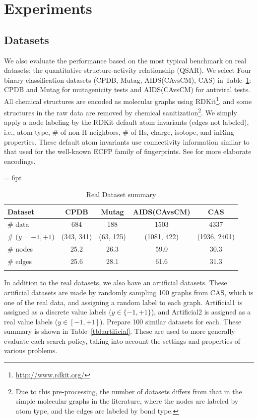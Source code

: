 \section{Experiments}
\subsection{Datasets}
We also evaluate the performance based on the most typical benchmark on real datasets:
the quantitative structure-activity relationship (QSAR). 
We select Four binary-classification datasets (CPDB, Mutag, AIDS(CAvsCM), CAS) in Table~\ref{tbl:dataset}: 
CPDB and Mutag for mutagenicity tests and AIDS(CAvsCM) for antiviral tests.
All chemical structures are encoded as molecular graphs using RDKit\footnote{\url{http://www.rdkit.org/}}, 
and some structures in the raw data are removed by chemical sanitization\footnote{
Due to this pre-processing, the number of datasets differs from that 
in the simple molecular graphs in the literature, 
where the nodes are labeled by atom type, and the edges are labeled by bond type.}.
We simply apply a node labeling by the RDKit default atom invariants (edges not labeled), i.e., 
atom type, \# of non-H neighbors, \# of Hs, charge, isotope, and inRing properties. 
These default atom invariants use connectivity information similar to that used for the well-known 
ECFP family of fingerprints\cite{Rogers:2010}. See \cite{Kearnes2016} for more elaborate encodings.

\tabcolsep = 6pt
\begin{table}[h]
  \centering
  \caption{Real Dataset summary}
  \label{tbl:dataset}
  	\begin{tabular}{lcccc}
		\thickhline
		Dataset			& CPDB           & Mutag        & AIDS(CAvsCM)     & CAS	\\  \hline
		\# data			& 684            & 188          & 1503             & 4337	\\
		\# ($y=-1,+1$)	& (343, 341)     & (63, 125)    & (1081, 422)      & (1936, 2401)	\\  
		\# nodes		& 25.2           & 26.3         & 59.0             & 30.3	\\  
		\# edges		& 25.6           & 28.1         & 61.6             & 31.3	\\  
		\thickhline
		\end{tabular}
\end{table}

In addition to the real datasets, we also have an artificial datasets.
These artificial datasets are made by randomly sampling 100 graphs from CAS, 
which is one of the real data, and assigning a random label to each graph. 
Artificial1 is assigned as a discrete value labels ($y \in \{-1, +1\}$), 
and Artificial2 is assigned as a real value labels ($y \in [-1, +1]$).
Prepare 100 similar datasets for each.
These summary is shown in Table~\ref{tbl:artificial}.
These are used to more generally evaluate each search policy, 
taking into account the settings and properties of various problems.


